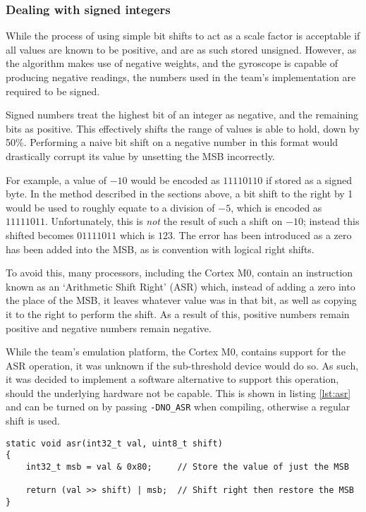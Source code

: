 \subsubsection{Dealing with signed integers \label{sec:asr}}

While the process of using simple bit shifts to act as a scale factor is acceptable if all values are known to be positive, and are as such stored unsigned. However, as the algorithm makes use of negative weights, and the gyroscope is capable of producing negative readings, the numbers used in the team's implementation are required to be signed.

Signed numbers treat the highest bit of an integer as negative, and the remaining bits as positive. This effectively shifts the range of values is able to hold, down by 50\%. Performing a naive bit shift on a negative number in this format would drastically corrupt its value by unsetting the MSB incorrectly.

For example, a value of $-10$ would be encoded as $11110110$ if stored as a signed byte. In the method described in the sections above, a bit shift to the right by 1 would be used to roughly equate to a division of $-5$, which is encoded as $11111011$. Unfortunately, this is \textit{not} the result of such a shift on $-10$; instead this shifted becomes $01111011$ which is $123$. The error has been introduced as a zero has been added into the MSB, as is convention with logical right shifts.

To avoid this, many processors, including the Cortex M0, contain an instruction known as an `Arithmetic Shift Right' (ASR) which, instead of adding a zero into the place of the MSB, it leaves whatever value was in that bit, as well as copying it to the right to perform the shift. As a result of this, positive numbers remain positive and negative numbers remain negative.

While the team's emulation platform, the Cortex M0, contains support for the ASR operation, it was unknown if the sub-threshold device would do so. As such, it was decided to implement a software alternative to support this operation, should the underlying hardware not be capable. This is shown in listing \ref{lst:asr} and can be turned on by passing \verb|-DNO_ASR| when compiling, otherwise a regular shift is used.

\begin{lstlisting}[caption={Software Arithmetic Shift Right Support},label={lst:asr}]
static void asr(int32_t val, uint8_t shift)
{
    int32_t msb = val & 0x80;     // Store the value of just the MSB

    return (val >> shift) | msb;  // Shift right then restore the MSB
}
\end{lstlisting}